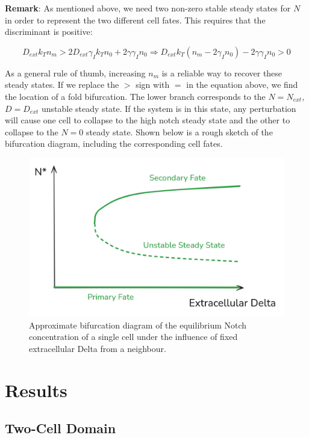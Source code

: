 \documentclass{article}
\begin{document}
\begin{flushleft}
\textbf{Remark}: As mentioned above, we need two non-zero stable steady states for $N$ in order to represent the two different cell fates. This requires that the discriminant is positive:

$$D_{ext}k_{T}n_{m} > 2D_{ext}\gamma_{I}k_{T}n_{0} + 2\gamma \gamma_{I} n_{0} \Rightarrow D_{ext}k_{T}(n_{m} - 2\gamma_{I}n_{0}) - 2\gamma \gamma_{I} n_{0} > 0$$

As a general rule of thumb, increasing $n_{m}$ is a reliable way to recover these steady states. If we replace the $>$ sign with $=$ in the equation above, we find the location of a fold bifurcation. The lower branch corresponds to the $N = N_{ext}$, $D = D_{ext}$ unstable steady state. If the system is in this state, any perturbation will cause one cell to collapse to the high notch steady state and the other to collapse to the $N = 0$ steady state. Shown below is a rough sketch of the bifurcation diagram, including the corresponding cell fates.

\begin{figure}
  \includegraphics[width=\textwidth]{img/bifurcation-diagram.png}
  \caption{Approximate bifurcation diagram of the equilibrium Notch concentration of a single cell under the influence of fixed extracellular Delta from a neighbour.}
\end{figure}

\section{Results}

\subsection{Two-Cell Domain}


\end{flushleft}
\end{document}
